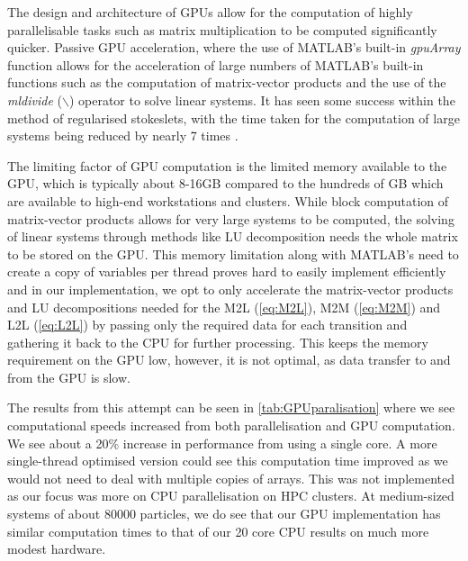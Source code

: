 The design and architecture of GPUs allow for the computation of highly parallelisable tasks such as matrix multiplication to be computed significantly quicker. Passive GPU acceleration, where the use of MATLAB's built-in \textit{gpuArray} function allows for the acceleration of large numbers of MATLAB's built-in functions such as the computation of matrix-vector products and the use of the \textit{mldivide} ($\backslash$) operator to solve linear systems. It has seen some success within the method of regularised stokeslets, with the time taken for the computation of large systems being reduced by nearly 7 times \cite{Gallagher2020}. 

The limiting factor of GPU computation is the limited memory available to the GPU, which is typically about 8-16GB compared to the hundreds of GB which are available to high-end workstations and clusters. While block computation of matrix-vector products allows for very large systems to be computed, the solving of linear systems through methods like LU decomposition needs the whole matrix to be stored on the GPU. This memory limitation along with MATLAB's need to create a copy of variables per thread proves hard to easily implement efficiently and in our implementation, we opt to only accelerate the matrix-vector products and LU decompositions needed for the M2L (\cref{eq:M2L}), M2M (\cref{eq:M2M}) and L2L (\cref{eq:L2L}) by passing only the required data for each transition and gathering it back to the CPU for further processing. This keeps the memory requirement on the GPU low, however, it is not optimal, as data transfer to and from the GPU is slow. 

The results from this attempt can be seen in \cref{tab:GPUparalisation} where we see computational speeds increased from both parallelisation and GPU computation. We see about a 20\% increase in performance from using a single core. A more single-thread optimised version could see this computation time improved as we would not need to deal with multiple copies of arrays. This was not implemented as our focus was more on CPU parallelisation on HPC clusters. At medium-sized systems of about 80000 particles, we do see that our GPU implementation has similar computation times to that of our 20 core CPU results on much more modest hardware. 

